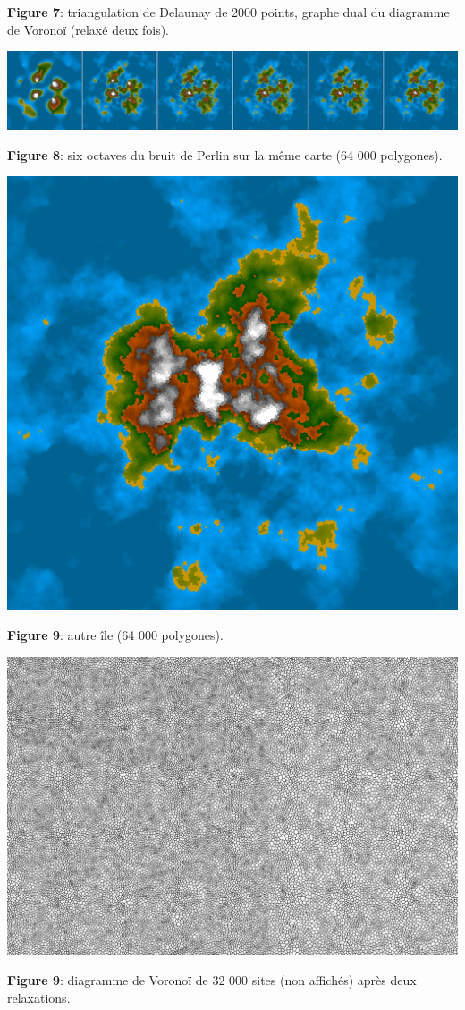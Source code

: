 \documentclass[a4paper, 10pt]{article}
\begin{document}
\begin{center}
\textbf{Figure 7}: triangulation de Delaunay de 2000 points, graphe dual du diagramme de Voronoï (relaxé deux fois).  
  
\bigbreak
\bigbreak
  
\includegraphics[scale=0.35]{Octaves.jpg}
  
\textbf{Figure 8}: six octaves du bruit de Perlin sur la même carte (64 000 polygones).  
  
\bigbreak
\includegraphics[scale=0.4]{Ile1.PNG}
  
\textbf{Figure 9}: autre île (64 000 polygones).  
  
\bigbreak
\includegraphics[scale=0.3]{Voronoi32000.PNG}
  
\textbf{Figure 9}: diagramme de Voronoï de 32 000 sites (non affichés) après deux relaxations.  
\end{center}  
\newpage
\end{document}
